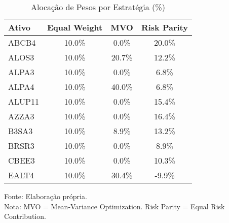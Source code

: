 \begin{table}[htbp]
\centering
\caption{Alocação de Pesos por Estratégia (\%)}
\label{tab:pesos_portfolios}
\begin{tabular}{|l|c|c|c|}
\hline
\textbf{Ativo} & \textbf{Equal Weight} & \textbf{MVO} & \textbf{Risk Parity} \\
\hline
ABCB4 & 10.0\% & 0.0\% & 20.0\% \\
ALOS3 & 10.0\% & 20.7\% & 12.2\% \\
ALPA3 & 10.0\% & 0.0\% & 6.8\% \\
ALPA4 & 10.0\% & 40.0\% & 6.8\% \\
ALUP11 & 10.0\% & 0.0\% & 15.4\% \\
AZZA3 & 10.0\% & 0.0\% & 16.4\% \\
B3SA3 & 10.0\% & 8.9\% & 13.2\% \\
BRSR3 & 10.0\% & 0.0\% & 8.9\% \\
CBEE3 & 10.0\% & 0.0\% & 10.3\% \\
EALT4 & 10.0\% & 30.4\% & -9.9\% \\
\hline
\end{tabular}
\footnotesize
Fonte: Elaboração própria.\\
Nota: MVO = Mean-Variance Optimization. Risk Parity = Equal Risk Contribution.
\end{table}
